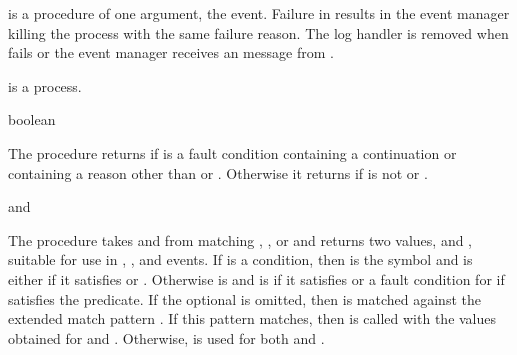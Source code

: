  is a procedure of one argument, the event. Failure in
 results in the event manager killing the 
process with the same failure reason. The log handler is removed when
 fails or the event manager receives an 
message from .

 is a process.

\begin{procedure}
\end{procedure}
\returns{} boolean

The  procedure returns  if  is
a fault condition containing a continuation or containing a reason other
than  or .
Otherwise it returns  if  is
not  or .

\begin{procedure}
\end{procedure}
\returns{}  and 

The  procedure takes  and 
from matching
,
, or
and returns two values,  and , suitable
for use in , ,
and  events.
If  is a condition, then  is the symbol 
and  is either  if it satisfies 
or .
Otherwise  is  and  is  if it
satisfies  or a fault condition for 
if  satisfies the  predicate.
If the optional  is omitted, then  is matched against the
extended match pattern .
If this pattern matches, then  is called with the
values obtained for  and .
Otherwise,  is used for both  and .
